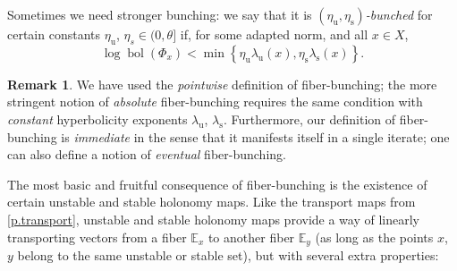 \documentclass[JEP,XML,SOM,Unicode]{cedram}
\theoremstyle{plain}
\theoremstyle{definition}
\newtheorem{remark}[theorem]{Remark}
\newcommand{\EE}{\mathbb{E}}
\newcommand{\uu}{\mathrm{u}}
\renewcommand{\ss}{\mathrm{s}}
\DeclareMathOperator{\bol}{bol}
\begin{document}
Sometimes we need stronger bunching: we say that it is \emph{$(\eta_\uu,\eta_\ss)$-bunched} for certain constants $\eta_\uu$, $\eta_s \in (0,\theta]$ if, for some adapted norm, and all $x\in X$,
\begin{equation}\label{e.def_strongly_bunched}
\log \bol(\Phi_x)
< \min \left\{ \eta_\uu \lambda_\uu(x), \eta_\ss \lambda_\ss(x)\right\}.
\end{equation}

\begin{remark}\label{r.pointwise_vs_absolute}
We have used the \emph{pointwise} definition of fiber-bunching;
the more stringent notion of \emph{absolute} fiber-bunching requires the same condition
with \emph{constant} hyperbolicity exponents $\lambda_\uu$, $\lambda_\ss$.
Furthermore, our definition of fiber-bunching is \emph{immediate} in the sense that it manifests itself in a single iterate; one can also define a notion of \emph{eventual} fiber-bunching.
\end{remark}

The most basic and fruitful consequence of fiber-bunching is the existence of certain unstable and stable holonomy maps.
Like the transport maps from \cref{p.transport}, unstable and stable holonomy maps provide a way of linearly transporting vectors from a fiber $\EE_x$ to another fiber $\EE_y$ (as long as the points $x$, $y$ belong to the same unstable or stable set), but with several extra properties:
\end{document}
